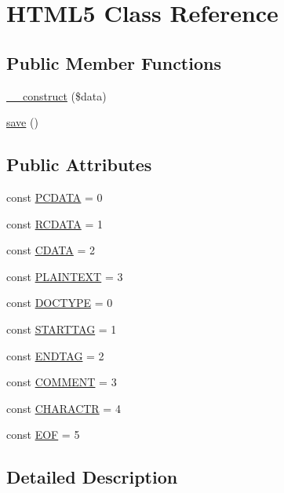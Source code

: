 \hypertarget{classHTML5}{\section{H\+T\+M\+L5 Class Reference}
\label{classHTML5}
}
\subsection*{Public Member Functions}
\begin{DoxyCompactItemize}
\item 
\hyperlink{classHTML5_a76befd6b0e4f28d4f0186243cb4eac44}{\+\_\+\+\_\+construct} (\$data)
\item 
\hyperlink{classHTML5_aa7db54ebf4368f074dedf6ea3327287c}{save} ()
\end{DoxyCompactItemize}
\subsection*{Public Attributes}
\begin{DoxyCompactItemize}
\item 
const \hyperlink{classHTML5_a01abf67d982563ea48ab1a966dfa6ed5}{P\+C\+D\+A\+T\+A} = 0
\item 
const \hyperlink{classHTML5_a520a3576293ae3cb17f4e8c20e594597}{R\+C\+D\+A\+T\+A} = 1
\item 
const \hyperlink{classHTML5_a101b02982ccb6d7f4410b305f295fd16}{C\+D\+A\+T\+A} = 2
\item 
const \hyperlink{classHTML5_afa0753128f661db20e6ce76aaf642a7d}{P\+L\+A\+I\+N\+T\+E\+X\+T} = 3
\item 
const \hyperlink{classHTML5_a9b83432e009926311f6ccf80412bf1cf}{D\+O\+C\+T\+Y\+P\+E} = 0
\item 
const \hyperlink{classHTML5_a94502c69fea29c30b3c2a74fc729a60d}{S\+T\+A\+R\+T\+T\+A\+G} = 1
\item 
const \hyperlink{classHTML5_abdb3e01603102e86b3183fcd6c844e17}{E\+N\+D\+T\+A\+G} = 2
\item 
const \hyperlink{classHTML5_a524946c9d8a275b583b50b4342f00a99}{C\+O\+M\+M\+E\+N\+T} = 3
\item 
const \hyperlink{classHTML5_a19976cfde8e4bbf3fe516cc44cb0baf4}{C\+H\+A\+R\+A\+C\+T\+R} = 4
\item 
const \hyperlink{classHTML5_a1cf386934bc9b550f918a596e668f9c1}{E\+O\+F} = 5
\end{DoxyCompactItemize}


\subsection{Detailed Description}


